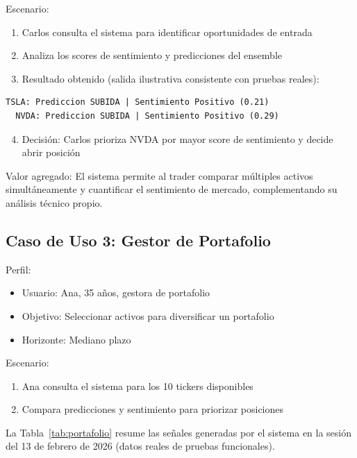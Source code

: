  Escenario:
  \begin{enumerate}
      \item Carlos consulta el sistema para identificar oportunidades de entrada
      \item Analiza los scores de sentimiento y predicciones del ensemble
      \item Resultado obtenido (salida ilustrativa consistente con pruebas reales):
  \end{enumerate}

  \begin{lstlisting}[language={}]
  TSLA: Prediccion SUBIDA | Sentimiento Positivo (0.21)
  NVDA: Prediccion SUBIDA | Sentimiento Positivo (0.29)  \end{lstlisting}

  \begin{enumerate}
      \setcounter{enumi}{3}
      \item Decisión: Carlos prioriza NVDA por mayor score de sentimiento y decide abrir      
  posición
  \end{enumerate}

  Valor agregado: El sistema permite al trader comparar múltiples activos
  simultáneamente y cuantificar el sentimiento de mercado, complementando su análisis técnico 
  propio.

  \subsection{Caso de Uso 3: Gestor de Portafolio}

 Perfil:
  \begin{itemize}
      \item Usuario: Ana, 35 años, gestora de portafolio
      \item Objetivo: Seleccionar activos para diversificar un portafolio
      \item Horizonte: Mediano plazo
  \end{itemize}

Escenario:
  \begin{enumerate}
      \item Ana consulta el sistema para los 10 tickers disponibles
      \item Compara predicciones y sentimiento para priorizar posiciones
  \end{enumerate}

  La Tabla~\ref{tab:portafolio} resume las señales generadas por el sistema en la sesión del  
  13 de febrero de 2026 (datos reales de pruebas funcionales).


